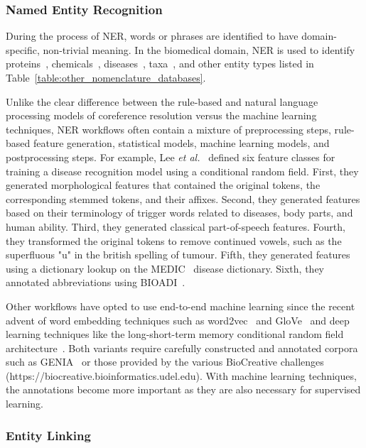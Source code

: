 \subsubsection*{Named Entity Recognition}

During the process of \ac{NER}, words or phrases are identified to have domain-specific, non-trivial meaning.
In the biomedical domain, \ac{NER} is used to identify proteins~\cite{Hsu2008,Leaman2008, Hakenberg2011,Wei2015}, chemicals~\cite{Leaman2015,Corbett2018,Giorgi526244}, diseases~\cite{Leaman2013,Giorgi526244}, taxa~\cite{Gerner2010,Wei2012}, and other entity types listed in Table~\ref{table:other_nomenclature_databases}.

Unlike the clear difference between the rule-based and natural language processing models of coreference resolution versus the machine learning techniques, \ac{NER} workflows often contain a mixture of preprocessing steps, rule-based feature generation, statistical models, machine learning models, and postprocessing steps.
For example, Lee \textit{et al.}~\cite{Lee2015} defined six feature classes for training a disease recognition model using a conditional random field.
First, they generated morphological features that contained the original tokens, the corresponding stemmed tokens, and their affixes.
Second, they generated features based on their terminology of trigger words related to diseases, body parts, and human ability.
Third, they generated classical part-of-speech features.
Fourth, they transformed the original tokens to remove continued vowels, such as the superfluous "u" in the british spelling of tumour.
Fifth, they generated features using a dictionary lookup on the MEDIC~\cite{Davis2012} disease dictionary.
Sixth, they annotated abbreviations using BIOADI~\cite{Kuo2009}.

Other workflows have opted to use end-to-end machine learning since the recent advent of word embedding techniques such as word2vec~\cite{Mikolov2013} and GloVe~\cite{Pennington2014} and deep learning techniques like the long-short-term memory conditional random field architecture~\cite{Lample2016}.
Both variants require carefully constructed and annotated corpora such as GENIA~\cite{Kim2003} or those provided by the various BioCreative challenges (https://biocreative.bioinformatics.udel.edu).
With machine learning techniques, the annotations become more important as they are also necessary for supervised learning.


\subsubsection*{Entity Linking}

